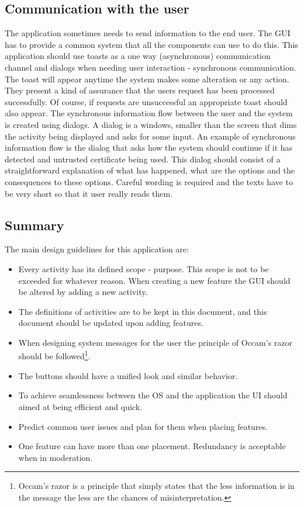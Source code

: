 \documentclass[11pt]{article} %
\begin{document}
\subsection{Communication with the user}
The application sometimes needs to send information to the end user. The GUI has to provide a common system that all the components can use to do this. This application should use toasts as a one way (asynchronous) communication channel and dialogs when needing user interaction - synchronous communication. The toast will appear anytime the system makes some alteration or any action. They present a kind of assurance that the users request has been processed successfully. Of course, if requests are unsuccessful an appropriate toast should also appear. The synchronous information flow between the user and the system is created using dialogs. A dialog is a windows, smaller than the screen that dims the activity being displayed and asks for some input. An example of synchronous information flow is the dialog that asks how the system should continue if it has detected and untrusted certificate being used. This dialog should consist of a straightforward explanation of what has happened, what are the options and the consequences to these options. Careful wording is required and the texts have to be very short so that it user really reads them. 

\subsection{Summary}
The main design guidelines for this application are:
\begin{itemize}
\item Every activity has its defined scope - purpose. This scope is not to be exceeded for whatever reason. When creating a new feature the GUI should be altered by adding a new activity.
\item The definitions of activities are to be kept in this document, and this document should be updated upon adding features.
\item When designing system messages for the user the principle of Occam's razor should be followed\footnote{Occam's razor is a principle that simply states that the less information is in the message the less are the chances of misinterpretation.}. 
\item The buttons should have a unified look and similar behavior.
\item To achieve seamlessness between the OS and the application the UI should aimed at being efficient and quick.
\item Predict common user issues and plan for them when placing features.
\item One feature can have more than one placement. Redundancy is acceptable when in moderation.
\end{itemize}
\end{document}
